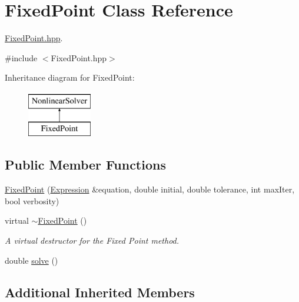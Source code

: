 \hypertarget{class_fixed_point}{}\section{Fixed\+Point Class Reference}
\label{class_fixed_point}


\hyperlink{_fixed_point_8hpp_source}{Fixed\+Point.\+hpp}.  




{\ttfamily \#include $<$Fixed\+Point.\+hpp$>$}

Inheritance diagram for Fixed\+Point\+:\begin{figure}[H]
\begin{center}
\leavevmode
\includegraphics[height=2.000000cm]{class_fixed_point}
\end{center}
\end{figure}
\subsection*{Public Member Functions}
\begin{DoxyCompactItemize}
\item 
\hyperlink{class_fixed_point_aa5da7897eeeb9934b5f40b9b39b65464}{Fixed\+Point} (\hyperlink{class_expression}{Expression} \&equation, double initial, double tolerance, int max\+Iter, bool verbosity)
\item 
virtual \hyperlink{class_fixed_point_a489d5b95254cefb7248a3b2a9906464e}{$\sim$\+Fixed\+Point} ()\hypertarget{class_fixed_point_a489d5b95254cefb7248a3b2a9906464e}{}\label{class_fixed_point_a489d5b95254cefb7248a3b2a9906464e}

\begin{DoxyCompactList}\small\item\em A virtual destructor for the Fixed Point method. \end{DoxyCompactList}\item 
double \hyperlink{class_fixed_point_abc468159d11955a2a78a5278cf3339f6}{solve} ()
\end{DoxyCompactItemize}
\subsection*{Additional Inherited Members}


